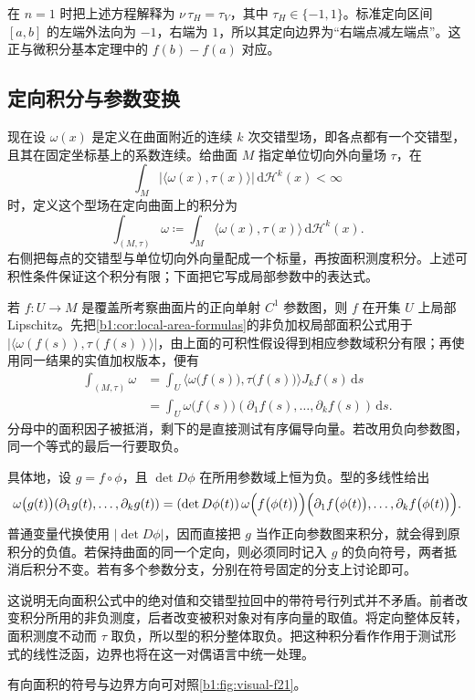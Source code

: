 \ProseParagraphBreak

在 \(n=1\) 时把上述方程解释为 \(\nu\,\tau_H=\tau_V\)，其中 \(\tau_H\in\{-1,1\}\)。标准定向区间 \([a,b]\) 的左端外法向为 \(-1\)，右端为 \(1\)，所以其定向边界为“右端点减左端点”。这正与微积分基本定理中的 \(f(b)-f(a)\) 对应。

\subsection{定向积分与参数变换}
\label{b1:subsec:B10504}

现在设 \(\omega(x)\) 是定义在曲面附近的连续 \(k\) 次交错型场，即各点都有一个交错型，且其在固定坐标基上的系数连续。给曲面 \(M\) 指定单位切向外向量场 \(\tau\)，在
\[
 \int_M\bigl|\langle\omega(x),\tau(x)\rangle\bigr|
       \,\mathrm d\mathcal H^k(x)<\infty
\]
时，定义这个型场在定向曲面上的积分为
\[
 \int_{(M,\tau)}\omega
   \coloneqq\int_M\langle\omega(x),\tau(x)\rangle
          \,\mathrm d\mathcal H^k(x).
\]
右侧把每点的交错型与单位切向外向量配成一个标量，再按面积测度积分。上述可积性条件保证这个积分有限；下面把它写成局部参数中的表达式。

\ProseParagraphBreak

若 \(f:U\rightarrow M\) 是覆盖所考察曲面片的正向单射 \(C^1\) 参数图，则 \(f\) 在开集 \(U\) 上局部 Lipschitz。先把\cref{b1:cor:local-area-formulas}的非负加权局部面积公式用于
\(\bigl|\langle\omega(f(s)),\tau(f(s))\rangle\bigr|\)，由上面的可积性假设得到相应参数域积分有限；再使用同一结果的实值加权版本，便有
\[
 \begin{aligned}
 \int_{(M,\tau)}\omega
 &=\int_U
   \langle\omega\bigl(f(s)\bigr),\tau\bigl(f(s)\bigr)\rangle
       J_kf(s)\,\mathrm ds\\
 &=\int_U
   \omega\bigl(f(s)\bigr)(\partial_1f(s),\ldots,\partial_kf(s))
       \,\mathrm ds.
 \end{aligned}
\]
分母中的面积因子被抵消，剩下的是直接测试有序偏导向量。若改用负向参数图，同一个等式的最后一行要取负。

\ProseParagraphBreak

具体地，设 \(g=f\circ\phi\)，且 \(\det D\phi\) 在所用参数域上恒为负。型的多线性给出
\[
 \omega\bigl(g(t)\bigr)(\partial_1g(t),\ldots,\partial_kg(t))
 =(\det D\phi(t))\,
   \omega\Bigl(f\bigl(\phi(t)\bigr)\Bigr)
       \Bigl(\partial_1f\bigl(\phi(t)\bigr),\ldots,
             \partial_kf\bigl(\phi(t)\bigr)\Bigr).
\]
普通变量代换使用 \(|\det D\phi|\)，因而直接把 \(g\) 当作正向参数图来积分，就会得到原积分的负值。若保持曲面的同一个定向，则必须同时记入 \(g\) 的负向符号，两者抵消后积分不变。若有多个参数分支，分别在符号固定的分支上讨论即可。

\ProseParagraphBreak

这说明无向面积公式中的绝对值和交错型拉回中的带符号行列式并不矛盾。前者改变积分所用的非负测度，后者改变被积对象对有序向量的取值。将定向整体反转，面积测度不动而 \(\tau\) 取负，所以型的积分整体取负。把这种积分看作作用于测试形式的线性泛函，边界也将在这一对偶语言中统一处理。

有向面积的符号与边界方向可对照\cref{b1:fig:visual-f21}。


